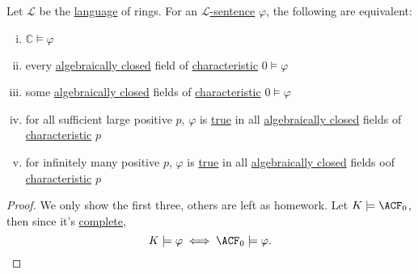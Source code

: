 \begin{corollary}\label{col:Leftschetz-principle}
	Let \(\mathcal{L} \) be the \hyperref[def:language]{language} of rings. For an \hyperref[def:sentence]{\(\mathcal{L}\)-sentence} \(\varphi \), the following are equivalent:
	\begin{enumerate}[(i)]
		\item \(\mathbb{C} \models \varphi \)
		\item every \hyperref[def:algebraically-closed]{algebraically closed} field of \hyperref[def:characteristic]{characteristic} \(0 \models \varphi \)
		\item some \hyperref[def:algebraically-closed]{algebraically closed} fields of \hyperref[def:characteristic]{characteristic} \(0 \models \varphi \)
		\item for all sufficient large positive \(p\), \(\varphi \) is \hyperref[def:truth]{true} in all \hyperref[def:algebraically-closed]{algebraically closed} fields of \hyperref[def:characteristic]{characteristic} \(p\)
		\item for infinitely many positive \(p\), \(\varphi \) is \hyperref[def:truth]{true} in all \hyperref[def:algebraically-closed]{algebraically closed} fields oof \hyperref[def:characteristic]{characteristic} \(p\)
	\end{enumerate}
\end{corollary}
\begin{proof}
	We only show the first three, others are left as homework. Let \(K \models \ACF_0\), then since it's \hyperref[def:theory-complete]{complete},
	\[
		K \models \varphi \iff \ACF_0 \models \varphi .
	\]
\end{proof}


